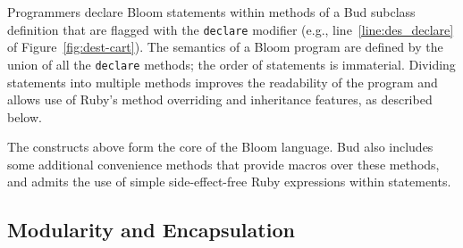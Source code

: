 
Programmers declare Bloom statements within methods of a Bud subclass
definition that are flagged with the \texttt{declare} modifier (e.g.,
line~\ref{line:des_declare} of Figure~\ref{fig:dest-cart}). The semantics
of a Bloom program are defined by the union of all the \texttt{declare}
methods; the order of statements is immaterial. Dividing statements into multiple
methods improves the readability of the program and allows use of Ruby's method
overriding and inheritance features, as described below.  


The constructs above form the core of the Bloom language.
Bud also includes some additional convenience methods that provide macros over these methods, and admits the use of simple side-effect-free Ruby expressions within statements. 


\subsection{Modularity and Encapsulation}
\label{sec:modularity}

